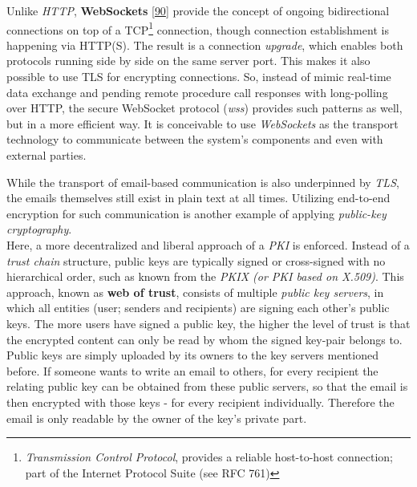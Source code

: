 \documentclass[12pt,english,a4paper,titlepage,cleardoublepage=empty,dottedtoc]{report}
\begin{document}
Unlike \emph{HTTP}, \textbf{WebSockets}
{[}\protect\hyperlink{ref-web_spec_websockets}{90}{]} provide the
concept of ongoing bidirectional connections on top of a TCP\footnote{\emph{Transmission
  Control Protocol}, provides a reliable host-to-host connection; part
  of the Internet Protocol Suite (see RFC 761)} connection, though
connection establishment is happening via HTTP(S). The result is a
connection \emph{upgrade}, which enables both protocols running side by
side on the same server port. This makes it also possible to use TLS for
encrypting connections. So, instead of mimic real-time data exchange and
pending remote procedure call responses with long-polling over HTTP, the
secure WebSocket protocol (\emph{wss}) provides such patterns as well,
but in a more efficient way. It is conceivable to use \emph{WebSockets}
as the transport technology to communicate between the system's
components and even with external parties.

While the transport of email-based communication is also underpinned by
\emph{TLS}, the emails themselves still exist in plain text at all
times. Utilizing end-to-end encryption for such communication is another
example of applying \emph{public-key cryptography}.\\
Here, a more decentralized and liberal approach of a \emph{PKI} is
enforced. Instead of a \emph{trust chain} structure, public keys are
typically signed or cross-signed with no hierarchical order, such as
known from the \emph{PKIX (or PKI based on X.509)}. This approach, known
as \textbf{web of trust}, consists of multiple \emph{public key
servers}, in which all entities (user; senders and recipients) are
signing each other's public keys. The more users have signed a public
key, the higher the level of trust is that the encrypted content can
only be read by whom the signed key-pair belongs to. Public keys are
simply uploaded by its owners to the key servers mentioned before. If
someone wants to write an email to others, for every recipient the
relating public key can be obtained from these public servers, so that
the email is then encrypted with those keys - for every recipient
individually. Therefore the email is only readable by the owner of the
key's private part.
\end{document}
